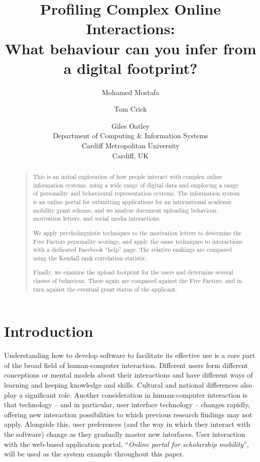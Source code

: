 \documentclass[letterpaper]{article}
\begin{document}
%
\title{Profiling Complex Online Interactions:\\What behaviour can you infer from a digital footprint?}
\author{Mohamed Mostafa \and Tom Crick \and Giles Oatley\\
Department of Computing \& Information Systems\\
Cardiff Metropolitan University\\
Cardiff, UK
}
\maketitle
\begin{abstract}
\begin{quote}
This is an initial exploration of how people interact with complex
online information systems, using a wide range of digital data and
employing a range of personality and behavioural representation
systems. The information system is an online portal for submitting
applications for an international academic mobility grant scheme, and
we analyse document uploading behaviour, motivation letters, and
social media interactions.

We apply psycholinguistic techniques to the motivation letters to
determine the Five Factors personality scorings, and apply the same
techniques to interactions with a dedicated Facebook ``help''
page. The relative rankings are compared using the Kendall rank
correlation statistic.

Finally, we examine the upload footprint for the users and determine
several classes of behaviour. These again are compared against the
Five Factors, and in turn against the eventual grant status of the
applicant.
\end{quote}
\end{abstract}


\section{Introduction}

Understanding how to develop software to facilitate its effective use
is a core part of the broad field of human-computer
interaction. Different users form different conceptions or mental
models about their interactions and have different ways of learning
and keeping knowledge and skills. Cultural and national differences
also play a significant role. Another consideration in human-computer
interaction is that technology -- and in particular, user interface
technology -- changes rapidly, offering new interaction possibilities
to which previous research findings may not apply. Alongside this,
user preferences (and the way in which they interact with the
software) change as they gradually master new interfaces. User
interaction with the web-based application portal, ``{\emph{Online
portal for scholarship mobility}}'', will be used as the system
example throughout this paper.
\end{document}
